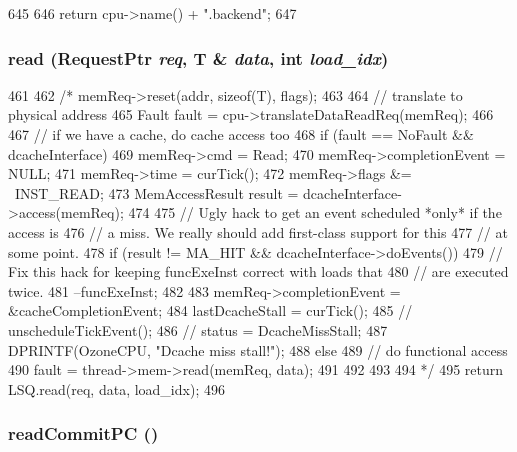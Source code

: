 \begin{DoxyCode}
645 {
646     return cpu->name() + ".backend";
647 }
\end{DoxyCode}
\hypertarget{classBackEnd_a0747777ac998dabdc20fa0c554d378d3}{
\subsubsection[{read}]{ read ({\bf RequestPtr} {\em req}, \/  T \& {\em data}, \/  int {\em load\_\-idx})}}
\label{classBackEnd_a0747777ac998dabdc20fa0c554d378d3}



\begin{DoxyCode}
461 {
462 /*    memReq->reset(addr, sizeof(T), flags);
463 
464     // translate to physical address
465     Fault fault = cpu->translateDataReadReq(memReq);
466 
467     // if we have a cache, do cache access too
468     if (fault == NoFault && dcacheInterface) {
469         memReq->cmd = Read;
470         memReq->completionEvent = NULL;
471         memReq->time = curTick();
472         memReq->flags &= ~INST_READ;
473         MemAccessResult result = dcacheInterface->access(memReq);
474 
475         // Ugly hack to get an event scheduled *only* if the access is
476         // a miss.  We really should add first-class support for this
477         // at some point.
478         if (result != MA_HIT && dcacheInterface->doEvents()) {
479             // Fix this hack for keeping funcExeInst correct with loads that
480             // are executed twice.
481             --funcExeInst;
482 
483             memReq->completionEvent = &cacheCompletionEvent;
484             lastDcacheStall = curTick();
485 //          unscheduleTickEvent();
486 //          status = DcacheMissStall;
487             DPRINTF(OzoneCPU, "Dcache miss stall!\n");
488         } else {
489             // do functional access
490             fault = thread->mem->read(memReq, data);
491 
492         }
493     }
494 */
495     return LSQ.read(req, data, load_idx);
496 }
\end{DoxyCode}
\hypertarget{classBackEnd_aa28f3fe58fde4b038a92b9f87a40cb10}{
\subsubsection[{readCommitPC}]{ readCommitPC ()}}
\label{classBackEnd_aa28f3fe58fde4b038a92b9f87a40cb10}



